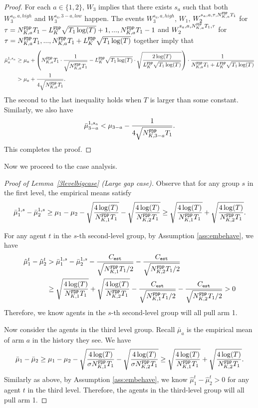 \begin{proof}%
  For each $a \in \{1,2\}$, $W_3$ implies that there exists $s_a$ such
  that both $W_3^{s_a,a,high}$ and $W_3^{s_a,3-a,low}$ happen.  The
  events $W_3^{s_a,a,high}$, $W_1$, $W_2^{s_a,a,\z, \fdpN T_1}$
  for $\z = \fdpN T_1- \GdT \sqrt{T_1\log(T)}+1, ...,\fdpN T_1-1$ and
  $W_2^{s_a,a,\fdpN T_1,\z}$ for
  $\z= \fdpN T_1,...,\fdpN T_1+ \GdT \sqrt{T_1\log(T)}$ together imply that
\begin{align*}
\bar{\mu}_a ^{1,s_a} &\geq \mu_a + \left(\fdpN T_1 \cdot \frac{1}{\sqrt{\fdpN T_1}} - \GdT \sqrt{T_1\log(T)} \cdot \sqrt{\frac{2\log(T)}{ \GdT \sqrt{T_1\log(T)}}} \right) \cdot \frac{1}{\fdpN T_1+ \GdT \sqrt{T_1\log(T)}} \\
&> \mu_a + \frac{1}{4\sqrt{\fdpN T_1}}.
\end{align*}
The second to the last inequality holds when $T$ is larger than some constant.
Similarly, we also have
\[
\bar{\mu}_{3-a} ^{1,s_a} < \mu_{3-a}   - \frac{1}{4\sqrt{\fdpN[3-a] T_1}}.
\]
This completes the proof.
\end{proof}


Now we proceed to the case analysis.


\begin{proof}[Proof of Lemma~\ref{3levelbigcase} (Large gap case)]
  Observe that for any group $s$ in the first level, the empirical
  means satisfy
\[
\bar{\mu}_1^{1,s} - \bar{\mu}_2^{1,s} \geq \mu_1 -\mu_2 - \sqrt{\frac{4\log(T)}{\fdpN[1]T_1}} - \sqrt{\frac{4\log(T)}{\fdpN[2]T_1}} \geq  \sqrt{\frac{4\log(T)}{\fdpN[1]T_1}} + \sqrt{\frac{4\log(T)}{\fdpN[2]T_1}}.
\]


For any agent $t$ in the $s$-th second-level group, by Assumption \ref{ass:embehave}, we have
\begin{align*}
\hat{\mu}_1^t - \hat{\mu}_2^t &>\bar{\mu}_1^{1,s} - \bar{\mu}_2^{1,s} - \frac{\estC}{\sqrt{\fdpN[1]T_1/2}} - \frac{\estC}{\sqrt{\fdpN[2]T_1/2}}\\
&\geq  \sqrt{\frac{4\log(T)}{\fdpN[1]T_1}} + \sqrt{\frac{4\log(T)}{\fdpN[2]T_1}}- \frac{\estC}{\sqrt{\fdpN[1]T_1/2}} - \frac{\estC}{\sqrt{\fdpN[2]T_1/2}} > 0
\end{align*}
Therefore, we know agents in the $s$-th second-level group will all pull arm 1.

Now consider the agents in the third level group. Recall $\bar{\mu}_a$
is the empirical mean of arm $a$ in the history they see. We have
\[
\bar{\mu}_1 - \bar{\mu}_2 \geq \mu_1 -\mu_2 - \sqrt{\frac{4\log(T)}{\NG\fdpN[1]T_1}} - \sqrt{\frac{4\log(T)}{\NG\fdpN[2]T_1}} \geq  \sqrt{\frac{4\log(T)}{\fdpN[1]T_1}}
+ \sqrt{\frac{4\log(T)}{\fdpN[2]T_1}}.
\]
Similarly as above, by Assumption \ref{ass:embehave}, we know
$\hat{\mu}_1^t - \hat{\mu}_2^t > 0$ for any agent $t$ in the third
level. Therefore, the agents in the third-level group will all pull
arm 1.  
\end{proof}


